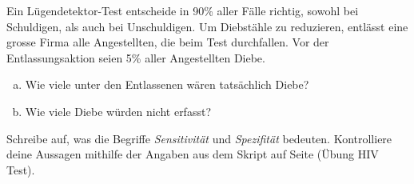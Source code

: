 \documentclass[%
11pt,%
twoside,%
titlepage,%
german,%
headsepline%
]{scrartcl}
\begin{document}
\begin{ueb}[Lügendetektortest]
Ein Lügendetektor-Test entscheide in 90\% aller Fälle richtig, sowohl bei Schuldigen, als auch bei Unschuldigen. Um Diebstähle zu reduzieren, entlässt eine grosse Firma alle Angestellten, die beim Test durchfallen. Vor der Entlassungsaktion seien 5\% aller Angestellten Diebe.
\begin{enumerate}[a)]
\item Wie viele unter den Entlassenen wären tatsächlich Diebe?
\item Wie viele Diebe würden nicht erfasst?
\end{enumerate}
\end{ueb}


\begin{ueb}
Schreibe auf, was die Begriffe \emph{Sensitivität} und \emph{Spezifität} bedeuten. Kontrolliere deine Aussagen mithilfe der Angaben aus dem Skript auf Seite \pageref{ueb:hiv} (\"Ubung HIV Test).
\end{ueb}
\end{document}
